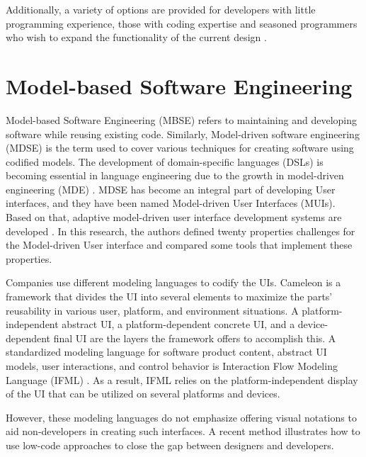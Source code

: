 Additionally, a variety of options are provided for developers with little programming experience, those with coding expertise and seasoned programmers who wish to expand the functionality of the current design \cite{article:nocode:sahina}.

\section{Model-based Software Engineering}
\label{background:section:mbse}
Model-based Software Engineering (MBSE) refers to maintaining and developing software while reusing existing code.
Similarly, Model-driven software engineering (MDSE) is the term used to cover various techniques for creating software using codified models.
The development of domain-specific languages (DSLs) is becoming essential in language engineering due to the growth in model-driven engineering (MDE) \cite{article:mbse:cuadrado}.
MDSE has become an integral part of developing User interfaces, and they have been named Model-driven User Interfaces (MUIs).
Based on that, adaptive model-driven user interface development systems are developed \cite{article:mbse:akiki}.
In this research, the authors defined twenty properties challenges for the Model-driven User interface and compared some tools that implement these properties.

Companies use different modeling languages to codify the UIs.
Cameleon \cite{article:cameleon:balme} is a framework that divides the UI into several elements to maximize the parts' reusability in various user, platform, and environment situations.
A platform-independent abstract UI, a platform-dependent concrete UI, and a device-dependent final UI are the layers the framework offers to accomplish this.
A standardized modeling language for software product content, abstract UI models, user interactions, and control behavior is Interaction Flow Modeling Language (IFML) \cite{article:ifml:piero}.
As a result, IFML relies on the platform-independent display of the UI that can be utilized on several platforms and devices.

However, these modeling languages do not emphasize offering visual notations to aid non-developers in creating such interfaces. 
A recent method \cite{article:mbse:bexiga} illustrates how to use low-code approaches to close the gap between designers and developers.

